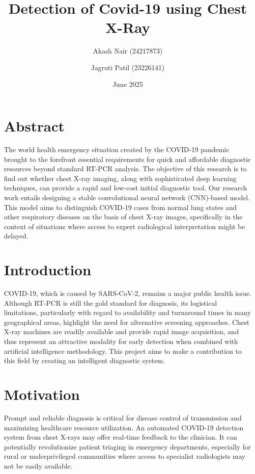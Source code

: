 \documentclass[10pt, a4paper]{article}
\title{Detection of Covid-19 using Chest X-Ray}
\author{Akash Nair (24217873) \and Jagruti Patil (23226141)}
\date{June 2025}
\begin{document}
\maketitle

\section*{Abstract}
The world health emergency situation created by the COVID-19 pandemic brought to the forefront essential requirements for quick and affordable diagnostic resources beyond standard RT-PCR analysis. The objective of this research is to find out whether chest X-ray imaging, along with sophisticated deep learning techniques, can provide a rapid and low-cost initial diagnostic tool. Our research work entails designing a stable convolutional neural network (CNN)-based model. This model aims to distinguish COVID-19 cases from normal lung states and other respiratory diseases on the basis of chest X-ray images, specifically in the context of situations where access to expert radiological interpretation might be delayed.

\section*{Introduction}
COVID-19, which is caused by SARS-CoV-2, remains a major public health issue. Although RT-PCR is still the gold standard for diagnosis, its logistical limitations, particularly with regard to availability and turnaround times in many geographical areas, highlight the need for alternative screening approaches. Chest X-ray machines are readily available and provide rapid image acquisition, and thus represent an attractive modality for early detection when combined with artificial intelligence methodology. This project aims to make a contribution to this field by creating an intelligent diagnostic system.

\section*{Motivation}
Prompt and reliable diagnosis is critical for disease control of transmission and maximizing healthcare resource utilization. An automated COVID-19 detection system from chest X-rays may offer real-time feedback to the clinician. It can potentially revolutionize patient triaging in emergency departments, especially for rural or underprivileged communities where access to specialist radiologists may not be easily available.
\end{document}
